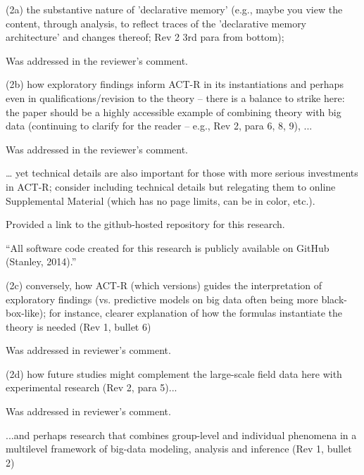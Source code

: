 \documentclass[answers,12pt]{exam}
\begin{document}
\begin{questions}
\question (2a) the substantive nature of 'declarative memory' (e.g., maybe you view the content, through analysis, to reflect traces of the 'declarative memory architecture' and changes thereof; Rev 2 3rd para from bottom);

\begin{solution}
Was addressed in the reviewer's comment.
\end{solution}

\question (2b) how exploratory findings inform ACT-R in its instantiations and perhaps even in qualifications/revision to the theory -- there is a balance to strike here: the paper should be a highly accessible example of combining theory with big data (continuing to clarify for the reader -- e.g., Rev 2, para 6, 8, 9), ...

\begin{solution}
Was addressed in the reviewer's comment.
\end{solution}

\question … yet technical details are also important for those with more serious investments in ACT-R; consider including technical details but relegating them to online Supplemental Material (which has no page limits, can be in color, etc.).

\begin{solution}
Provided a link to the github-hosted repository for this research.

``All software code created for this research is publicly available on GitHub (Stanley, 2014).''

\end{solution}

\question (2c) conversely, how ACT-R (which versions) guides the interpretation of exploratory findings (vs. predictive models on big data often being more black-box-like); for instance, clearer explanation of how the formulas instantiate the theory is needed (Rev 1, bullet 6)

\begin{solution}
Was addressed in reviewer's comment.
\end{solution}

\question (2d) how future studies might complement the large-scale field data here with experimental research (Rev 2, para 5)...

\begin{solution}
Was addressed in reviewer's comment.
\end{solution}

\question ...and perhaps research that combines group-level and individual phenomena in a multilevel framework of big-data modeling, analysis and inference (Rev 1, bullet 2)


\end{questions}
\end{document}
